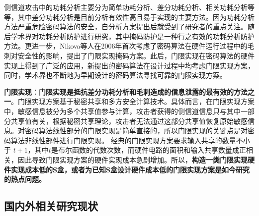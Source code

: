 \documentclass[a4paper,zihao=-4,AutoFakeBold]{ctexart}
\begin{document}
    
    

侧信道攻击中的功耗分析主要分为简单功耗分析、差分功耗分析、相关功耗分析等等，其中差分功耗分析是目前分析有效性高且易于实现的主要方法。因为功耗分析方法严重危险密码算法的安全，自分析方案提出后就受到了研究者的重点关注。随后学术界对功耗分析防护进行研究，其中掩码防护是一种行之有效的功耗分析防护方法。更进一步，Nikova等人在2006年首次考虑了密码算法在硬件运行过程中的毛刺对安全性的影响，提出了门限实现掩码方案。此后，门限实现在密码算法的硬件实现上得到了广泛的应用，新提出的密码算法在设计过程中均考虑门限实现方案，同时，学术界也不断地为早期设计的密码算法寻找可靠的门限实现方案。

    \textbf{门限实现}：\textbf{门限实现是抵抗差分功耗分析和毛刺造成的信息泄露的最有效的方法之一}。门限实现方案基于秘密共享和多方安全计算技术。具体而言，在门限实现方案中，敏感信息被分为多个共享值参与计算，攻击者获得的侧信道信息只与其中一部分共享值有关，根据秘密共享理论，攻击者无法通过这部分共享值恢复原始敏感信息。对密码算法线性部分的门限实现是简单直接的，所以门限实现的关键点是对密码算法非线性部件进行门限实现。
    经典的门限实现方案要求输入共享的数量不小于 $t+1$，其中$t$是布尔函数的代数次数，而硬件电路的面积和输入共享数量成正相关，因此导致门限实现方案的硬件实现成本急剧增加。所以，\textbf{构造一类门限实现硬件实现成本低的S盒，或者为已知S盒设计硬件成本低的门限实现方案是如今研究的热点问题。}


\subsection{国内外相关研究现状}
\end{document}
